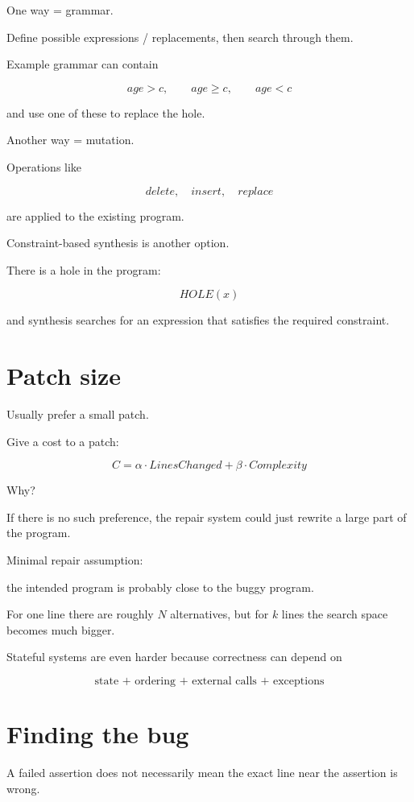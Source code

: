 \documentclass[11pt]{book}
\begin{document}
One way = grammar.

Define possible expressions / replacements,
then search through them.

Example grammar can contain

\[
age>c,\qquad age\geq c,\qquad age<c
\]

and use one of these to replace the hole.

Another way = mutation.

Operations like

\[
delete,\quad insert,\quad replace
\]

are applied to the existing program.

Constraint-based synthesis is another option.

There is a hole in the program:

\[
HOLE(x)
\]

and synthesis searches for an expression that satisfies
the required constraint.

\section{Patch size}

Usually prefer a small patch.

Give a cost to a patch:

\[
C=\alpha\cdot LinesChanged+
\beta\cdot Complexity
\]

Why?

If there is no such preference,
the repair system could just rewrite a large part
of the program.

\begin{ppnote}
Minimal repair assumption:

the intended program is probably close to the
buggy program.
\end{ppnote}

For one line there are roughly $N$ alternatives,
but for $k$ lines the search space becomes much bigger.

Stateful systems are even harder because correctness
can depend on

\[
\text{state + ordering + external calls + exceptions}
\]

\section{Finding the bug}

A failed assertion does not necessarily mean
the exact line near the assertion is wrong.
\end{document}
